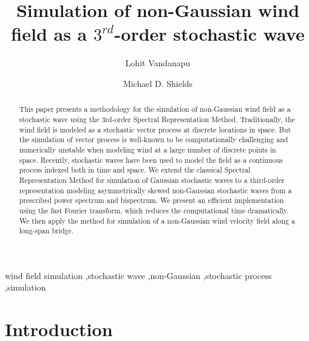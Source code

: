 \documentclass[preprint, review, 12pt]{elsarticle}
\begin{document}
\begin{frontmatter}

\title{Simulation of non-Gaussian wind field as a $3^{rd}$-order stochastic wave}

\author{Lohit Vandanapu}
\author{Michael D. Shields}

\address{Johns Hopkins University, Baltimore, United States}

\begin{abstract}
This paper presents a methodology for the simulation of non-Gaussian wind field as a stochastic wave using the 3rd-order Spectral Representation Method.  Traditionally, the wind field is modeled as a stochastic vector process at discrete locations in space. But the simulation of vector process is well-known to be computationally challenging and numerically unstable when modeling wind at a large number of discrete points in space. Recently, stochastic waves have been used to model the field as a continuous process indexed both in time and space. We extend the classical Spectral Representation Method for simulation of Gaussian stochastic waves to a third-order representation modeling asymmetrically skewed non-Gaussian stochastic waves from a prescribed power spectrum and bispectrum. We present an efficient implementation using the fast Fourier transform, which reduces the computational time dramatically. We then apply the method for simulation of a non-Gaussian wind velocity field along a long-span bridge.
\end{abstract}

\begin{keyword}
wind field simulation \sep stochastic wave \sep non-Gaussian \sep stochastic process \sep simulation

\end{keyword}

\end{frontmatter}

\section{Introduction}
\label{sec:introduction}

\end{document}
